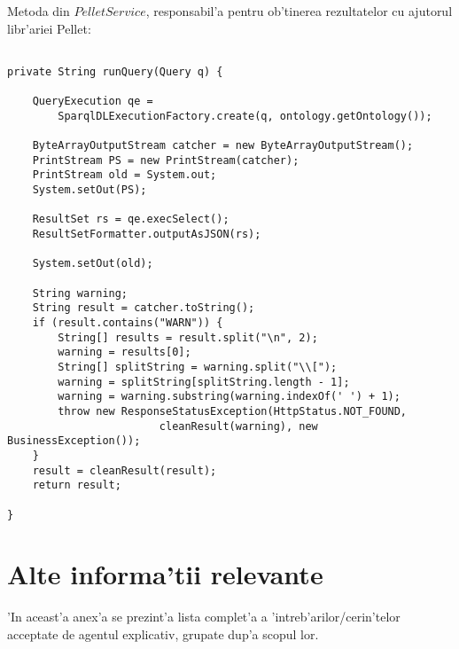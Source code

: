 Metoda din $PelletService$, responsabil'a pentru ob'tinerea rezultatelor cu ajutorul libr'ariei Pellet:

\begin{verbatim}

private String runQuery(Query q) {

    QueryExecution qe = 
        SparqlDLExecutionFactory.create(q, ontology.getOntology());

    ByteArrayOutputStream catcher = new ByteArrayOutputStream();
    PrintStream PS = new PrintStream(catcher);
    PrintStream old = System.out;
    System.setOut(PS);

    ResultSet rs = qe.execSelect();
    ResultSetFormatter.outputAsJSON(rs);

    System.setOut(old);

    String warning;
    String result = catcher.toString();
    if (result.contains("WARN")) {
        String[] results = result.split("\n", 2);
        warning = results[0];
        String[] splitString = warning.split("\\[");
        warning = splitString[splitString.length - 1];
        warning = warning.substring(warning.indexOf(' ') + 1);
        throw new ResponseStatusException(HttpStatus.NOT_FOUND,
                        cleanResult(warning), new BusinessException());
    }
    result = cleanResult(result);
    return result;

}
\end{verbatim}
\chapter{Alte informa'tii relevante}
'In aceast'a anex'a se prezint'a lista complet'a a 'intreb'arilor/cerin'telor acceptate de agentul explicativ, grupate dup'a scopul lor.

